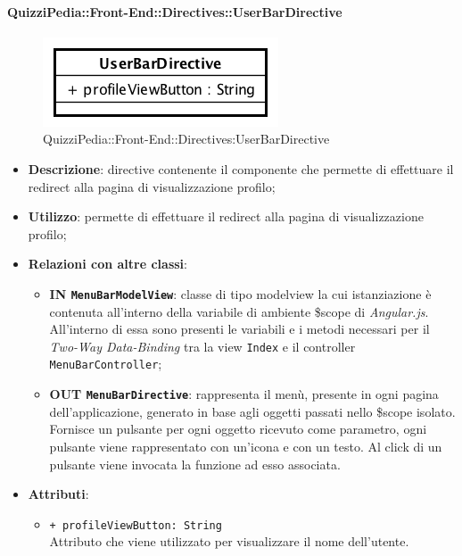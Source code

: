 \paragraph{QuizziPedia::Front-End::Directives::UserBarDirective}
\begin{figure} [ht]
	\centering
	\includegraphics[scale=0.80]{UML/Classi/Front-End/QuizziPedia_Front-end_Directives_UserBarDirective.png}
	\caption{QuizziPedia::Front-End::Directives:UserBarDirective}
\end{figure} \FloatBarrier
\begin{itemize}
	\item \textbf{Descrizione}: directive contenente il componente che permette di effettuare il redirect alla pagina di visualizzazione profilo;
	\item \textbf{Utilizzo}: permette di effettuare il redirect alla pagina di visualizzazione profilo;
	\item \textbf{Relazioni con altre classi}:
	\begin{itemize}
		\item \textbf{IN \texttt{MenuBarModelView}}: classe di tipo modelview la cui istanziazione è contenuta all'interno della variabile di ambiente \$scope di \textit{Angular.js}. All'interno di essa sono presenti le variabili e i metodi necessari per il \textit{Two-Way Data-Binding} tra la view \texttt{Index} e il controller \texttt{MenuBarController};
		\item \textbf{OUT \texttt{MenuBarDirective}}: rappresenta il menù, presente in ogni pagina dell'applicazione, generato in base agli oggetti passati nello \$scope isolato. Fornisce un pulsante per ogni oggetto ricevuto come parametro, ogni pulsante viene rappresentato con un’icona e con un testo. Al click di un pulsante viene invocata la funzione ad esso associata.  
	\end{itemize}
	\item \textbf{Attributi}:
	\begin{itemize}
		\item \texttt{+ profileViewButton: String} \\ Attributo che viene utilizzato per visualizzare il nome dell'utente.
	\end{itemize}
\end{itemize}